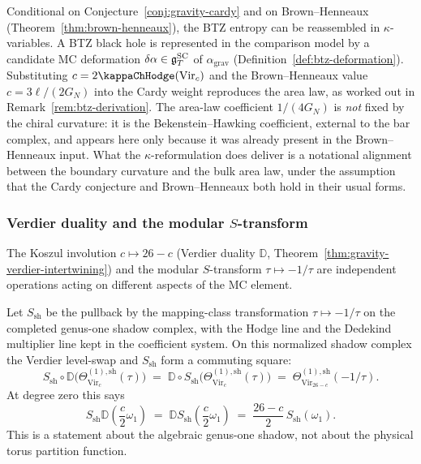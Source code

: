 \begin{remark}
\label{rem:btz-thesis}
Conditional on Conjecture~\ref{conj:gravity-cardy} and on
Brown--Henneaux (Theorem~\ref{thm:brown-henneaux}), the BTZ
entropy can be reassembled in $\kappa$-variables. A BTZ
black hole is represented in the comparison model by a candidate MC
deformation
$\delta\alpha \in \mathfrak{g}^{\mathrm{SC}}_T$ of $\alpha_{\mathrm{grav}}$
(Definition~\ref{def:btz-deformation}). Substituting
$c = 2\kappaChHodge(\mathrm{Vir}_c)$ and the Brown--Henneaux value
$c = 3\ell/(2G_N)$ into the Cardy weight reproduces the area
law, as worked out in Remark~\ref{rem:btz-derivation}. The
area-law coefficient $1/(4G_N)$ is \emph{not} fixed by the
chiral curvature: it is the Bekenstein--Hawking coefficient,
external to the bar complex, and appears here only because
it was already present in the Brown--Henneaux input. What
the $\kappa$-reformulation does deliver is a notational
alignment between the boundary curvature and the bulk area
law, under the assumption that the Cardy conjecture and
Brown--Henneaux both hold in their usual forms.
\end{remark}

\subsubsection*{Verdier duality and the modular $S$-transform}

The Koszul involution $c \mapsto 26-c$ (Verdier duality
$\mathbb{D}$, Theorem~\ref{thm:gravity-verdier-intertwining})
and the modular $S$-transform $\tau \mapsto -1/\tau$ are
independent operations acting on different aspects of the MC
element.

\begin{proposition}
\label{prop:gravity-D-S-commute}
Let \(S_{\mathrm{sh}}\) be the pullback by the mapping-class
transformation \(\tau\mapsto -1/\tau\) on the completed genus-one
shadow complex, with the Hodge line and the Dedekind multiplier line
kept in the coefficient system. On this normalized shadow complex the
Verdier level-swap and \(S_{\mathrm{sh}}\) form a commuting square:
\[
S_{\mathrm{sh}} \circ \mathbb{D}
\bigl(\Theta_{\mathrm{Vir}_c}^{(1),\mathrm{sh}}(\tau)\bigr)
\;=\;
\mathbb{D} \circ S_{\mathrm{sh}}
\bigl(\Theta_{\mathrm{Vir}_c}^{(1),\mathrm{sh}}(\tau)\bigr)
\;=\;
\Theta_{\mathrm{Vir}_{26-c}}^{(1),\mathrm{sh}}(-1/\tau).
\]
At degree zero this says
\[
S_{\mathrm{sh}}\mathbb{D}
\left(\frac{c}{2}\omega_1\right)
\;=\;
\mathbb{D}S_{\mathrm{sh}}
\left(\frac{c}{2}\omega_1\right)
\;=\;
\frac{26-c}{2}\,S_{\mathrm{sh}}(\omega_1).
\]
This is a statement about the algebraic genus-one shadow, not about
the physical torus partition function.
\end{proposition}

